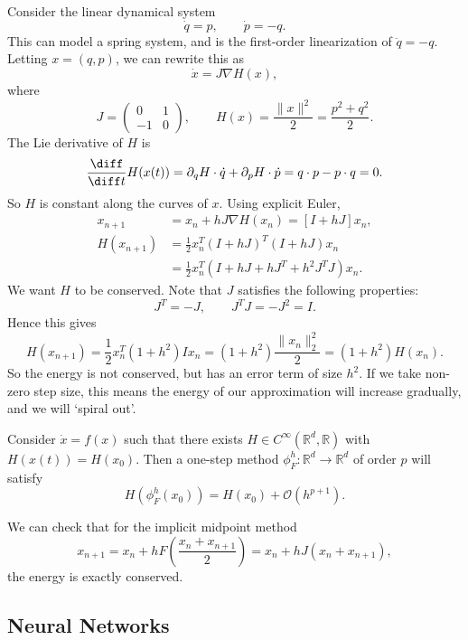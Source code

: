 \documentclass[12pt]{article}
\begin{document}
Consider the linear dynamical system
\[
\dot q = p, \qquad \dot p = - q.
\]
This can model a spring system, and is the first-order linearization of $\ddot q = -q$. Letting $x = (q, p)$, we can rewrite this as
\[
\dot x= J \nabla H(x),
\]
where
\[
J =
\begin{pmatrix}
	0 & 1 \\ -1 & 0
\end{pmatrix}, \qquad H(x) = \frac{\|x\|^2}{2} = \frac{p^2 + q^2}{2}.
\]
The Lie derivative of $H$ is
\[
\frac{\diff}{\diff t} H(x(t)) = \partial_q H \cdot \dot q + \partial_p H \cdot \dot p = q \cdot p - p \cdot q = 0.
\]
So $H$ is constant along the curves of $x$. Using explicit Euler,
\begin{align*}
	x_{n+1} &= x_n + h J \nabla H (x_n) = [I + h J]x_n, \\
	H(x_{n+1}) &= \frac 12 x_n^{T}(I + h J)^T (I + h J) x_n \\
		   &= \frac 12 x_n^{T}(I + h J + h J^{T} + h^2 J^{T} J)x_n.
\end{align*}
We want $H$ to be conserved. Note that $J$ satisfies the following properties:
\[
J^{T} = -J, \qquad J^{T}J = - J^2 = I.
\]
Hence this gives
\[
H(x_{n+1}) = \frac 12 x_n^{T} ( 1 + h^2) I x_n = (1 + h^2) \frac{\|x_n\|_2^2}{2} = (1 + h^2)H(x_n).
\]
So the energy is not conserved, but has an error term of size $h^2$. If we take non-zero step size, this means the energy of our approximation will increase gradually, and we will `spiral out'.

\begin{proposition}
	Consider $\dot x = f(x)$ such that there exists $H \in C^{\infty}(\mathbb{R}^{d}, \mathbb{R})$ with $H(x(t)) = H(x_0)$. Then a one-step method $\phi_F^{h} : \mathbb{R}^{d} \to \mathbb{R}^{d}$ of order $p$ will satisfy
	\[
	H(\phi_F^{h}(x_0)) = H(x_0) + \mathcal{O}(h^{p+1}).
	\]
\end{proposition}

\begin{exbox}
	We can check that for the implicit midpoint method
	\[
	x_{n+1} = x_n + h F \left( \frac{x_n + x_{n+1}}{2} \right) = x_n + h J (x_n + x_{n+1}),
	\]
	the energy is exactly conserved.
\end{exbox}


\subsection{Neural Networks}%
\label{sub:nns}
\end{document}

